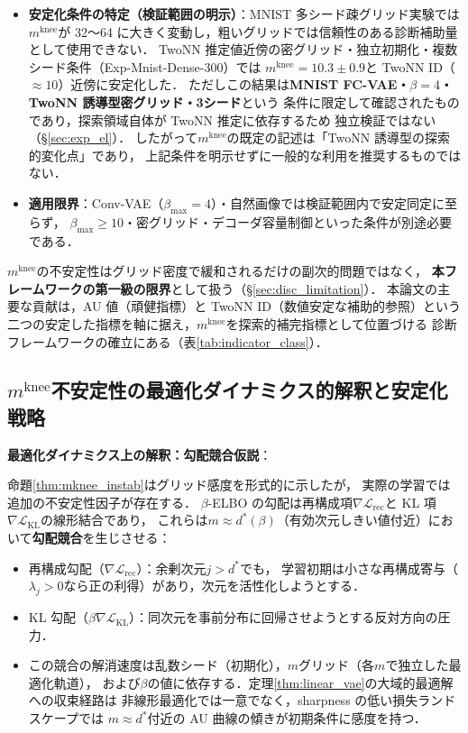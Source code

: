\documentclass[11pt,a4paper]{jsarticle}
\newcommand{\mknee}{m^{\mathrm{knee}}}
\begin{document}
\begin{itemize}
  \item \textbf{安定化条件の特定（検証範囲の明示）}：MNIST 多シード疎グリッド実験では$\mknee$が
        32〜64 に大きく変動し，粗いグリッドでは信頼性のある診断補助量として使用できない．
        TwoNN 推定値近傍の密グリッド・独立初期化・複数シード条件（Exp-Mnist-Dense-300）では
        $\mknee = 10.3 \pm 0.9$と TwoNN ID（$\approx 10$）近傍に安定化した．
        ただしこの結果は\textbf{MNIST FC-VAE・$\beta = 4$・TwoNN 誘導型密グリッド・3シード}という
        条件に限定して確認されたものであり，探索領域自体が TwoNN 推定に依存するため
        独立検証ではない（§\ref{sec:exp_el}）．
        したがって$\mknee$の既定の記述は「TwoNN 誘導型の探索的変化点」であり，
        上記条件を明示せずに一般的な利用を推奨するものではない．
  \item \textbf{適用限界}：Conv-VAE（$\beta_{\max}=4$）・自然画像では検証範囲内で安定同定に至らず，
        $\beta_{\max} \geq 10$・密グリッド・デコーダ容量制御といった条件が別途必要である．
\end{itemize}

$\mknee$の不安定性はグリッド密度で緩和されるだけの副次的問題ではなく，
\textbf{本フレームワークの第一級の限界}として扱う（§\ref{sec:disc_limitation}）．
本論文の主要な貢献は，AU 値（頑健指標）と TwoNN ID（数値安定な補助的参照）という
二つの安定した指標を軸に据え，$\mknee$を探索的補完指標として位置づける
診断フレームワークの確立にある（表\ref{tab:indicator_class}）．

\subsection{$\mknee$不安定性の最適化ダイナミクス的解釈と安定化戦略}\label{sec:disc_mknee_improve}

\textbf{最適化ダイナミクス上の解釈：勾配競合仮説}：

命題\ref{thm:mknee_instab}はグリッド感度を形式的に示したが，
実際の学習では追加の不安定性因子が存在する．
$\beta$-ELBO の勾配は再構成項$\nabla\mathcal{L}_\mathrm{rec}$と
KL 項$\nabla\mathcal{L}_\mathrm{KL}$の線形結合であり，
これらは$m \approx d^*(\beta)$（有効次元しきい値付近）において\textbf{勾配競合}を生じさせる：

\begin{itemize}
  \item 再構成勾配（$\nabla\mathcal{L}_\mathrm{rec}$）：余剰次元$j > d^*$でも，
        学習初期は小さな再構成寄与（$\lambda_j > 0$なら正の利得）があり，次元を活性化しようとする．
  \item KL 勾配（$\beta\nabla\mathcal{L}_\mathrm{KL}$）：同次元を事前分布に回帰させようとする反対方向の圧力．
  \item この競合の解消速度は乱数シード（初期化），$m$グリッド（各$m$で独立した最適化軌道），
        および$\beta$の値に依存する．定理\ref{thm:linear_vae}の大域的最適解への収束経路は
        非線形最適化では一意でなく，sharpness の低い損失ランドスケープでは
        $m \approx d^*$付近の AU 曲線の傾きが初期条件に感度を持つ．
\end{itemize}
\end{document}
